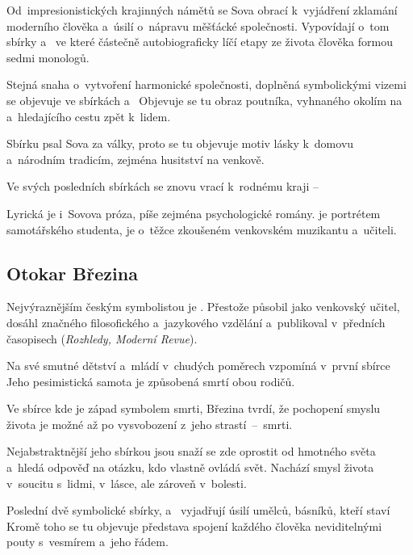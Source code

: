 Od~impresionistických krajinných námětů se Sova obrací k~vyjádření
zklamání moderního člověka a~úsilí o~nápravu měšťácké společnosti.
Vypovídají o~tom sbírky  a~ 
ve které částečně autobiograficky líčí etapy ze života člověka formou sedmi
monologů.

Stejná snaha o~vytvoření harmonické společnosti, doplněná symbolickými
vizemi se objevuje ve sbírkách   a~ Objevuje se tu obraz
poutníka, vyhnaného okolím na  a~hledajícího cestu zpět
k~lidem.

Sbírku  psal Sova za války, proto se tu objevuje
motiv lásky k~domovu a~národním tradicím, zejména husitství na venkově.

Ve svých posledních sbírkách se znovu vrací k~rodnému kraji --  

Lyrická je i~Sovova próza, píše zejména psychologické romány.  je portrétem samotářského studenta,  je o~těžce zkoušeném venkovském muzikantu a~učiteli.

\subsection*{Otokar Březina}
Nejvýraznějším českým symbolistou je . Přestože působil
jako venkovský učitel, dosáhl značného filosofického a~jazykového
vzdělání a~publikoval v~předních časopisech (\emph{Rozhledy, Moderní Revue}).

Na své smutné dětství a~mládí v~chudých poměrech vzpomíná v~první sbírce
 Jeho pesimistická samota je způsobená smrtí obou rodičů.

Ve sbírce  kde je západ symbolem smrti, Březina tvrdí,
že pochopení smyslu života je možné až po vysvobození z~jeho strastí~--~smrti.

Nejabstraktnější jeho sbírkou jsou  snaží se zde
oprostit od hmotného světa a~hledá odpověď na otázku, kdo vlastně ovládá
svět. Nachází smysl života v~soucitu s~lidmi, v~lásce, ale zároveň
v~bolesti.

Poslední dvě symbolické sbírky,  a~
vyjadřují úsilí umělců, básníků, kteří staví  Kromě toho se tu objevuje představa spojení každého člověka
neviditelnými pouty s~vesmírem a~jeho řádem.

